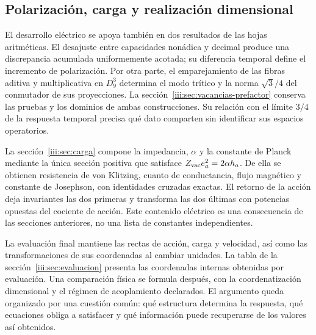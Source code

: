 \subsection{Polarización, carga y realización dimensional}

El desarrollo eléctrico se apoya también en dos resultados de las
hojas aritméticas. El desajuste entre capacidades nonádica y decimal
produce una discrepancia acumulada uniformemente acotada; su diferencia
temporal define el incremento de polarización. Por otra parte, el
emparejamiento de las fibras aditiva y multiplicativa en $D_9^3$
determina el modo trítico y la norma $\sqrt3/4$ del conmutador de sus
proyecciones. La sección~\ref{iii:sec:vacancias-prefactor} conserva
las pruebas y los dominios de ambas construcciones. Su relación con
el límite $3/4$ de la respuesta temporal precisa qué dato comparten
sin identificar sus espacios operatorios.

La sección~\ref{iii:sec:carga} compone la impedancia, $\alpha$ y la
constante de Planck mediante la única sección positiva que satisface
$Z_{\rm vac}e_a^2=2\alpha h_a$. De ella se obtienen resistencia de
von Klitzing, cuanto de conductancia, flujo magnético y constante de
Josephson, con identidades cruzadas exactas. El retorno de la acción
deja invariantes las dos primeras y transforma las dos últimas con
potencias opuestas del cociente de acción. Este contenido eléctrico
es una consecuencia de las secciones anteriores, no una lista de
constantes independientes.

La evaluación final mantiene las rectas de acción, carga y velocidad,
así como las transformaciones de sus coordenadas al cambiar unidades.
La tabla de la sección~\ref{iii:sec:evaluacion} presenta las coordenadas
internas obtenidas por evaluación. Una comparación física se formula después, con la coordenatización
dimensional y el régimen de acoplamiento declarados. El argumento
queda organizado por una cuestión común: qué estructura determina la
respuesta, qué ecuaciones obliga a satisfacer y qué información puede
recuperarse de los valores así obtenidos.

